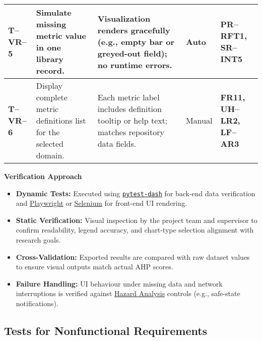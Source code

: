 \documentclass[12pt, titlepage]{article}
\begin{document}
\begin{longtable}{|p{}|p{}|p{}|p{}|p{}|}
\textbf{T--VR--5} & Simulate missing metric value in one library record. & Visualization renders gracefully (e.g., empty bar or greyed-out field); no runtime errors. & Auto & \textbf{PR--RFT1, SR--INT5} \\
\hline

\textbf{T--VR--6} & Display complete metric definitions list for the selected domain. & Each metric label includes definition tooltip or help text; matches repository data fields. & Manual & \textbf{FR11, UH--LR2, LF--AR3} \\
\hline

\end{longtable}

\noindent\textbf{Verification Approach}

\begin{itemize}
  \item \textbf{Dynamic Tests:} Executed using \texttt{\href{https://docs.pytest.org/en/stable/}{pytest-dash}} for back-end data verification and \href{https://playwright.dev/}{Playwright} or \href{https://www.selenium.dev/}{Selenium} for front-end UI rendering.
  \item \textbf{Static Verification:} Visual inspection by the project team and supervisor to confirm readability, legend accuracy, and chart-type selection alignment with research goals.
  \item \textbf{Cross-Validation:} Exported results are compared with raw dataset values to ensure visual outputs match actual AHP scores.
  \item \textbf{Failure Handling:} UI behaviour under missing data and network interruptions is verified against \href{https://github.com/thaafei/DomainX/blob/main/docs/HazardAnalysis/HazardAnalysis.pdf}{Hazard Analysis} controls (e.g., safe-state notifications).
\end{itemize}


\subsection{Tests for Nonfunctional Requirements}


\end{document}
